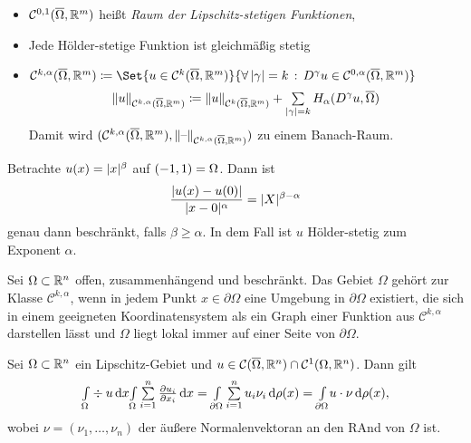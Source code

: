 \documentclass{cheat-sheet}
\newcommand{\Cont}{\mathcal{C}} %
\newcommand{\clos}[1]{\overline{#1}} %
\newcommand{\cOmega}{\clos{\Omega}} %
\newcommand{\bOmega}{\partial \Omega} %
\begin{document}
\begin{bem}
  \begin{itemize}
    \item $\Cont^{0,1}(\cOmega, \R^m)$ heißt \emph{Raum der Lipschitz-stetigen Funktionen},
    \item Jede Hölder-stetige Funktion ist gleichmäßig stetig
    \item $\Cont^{k,\alpha}(\cOmega, \R^m) \coloneqq \Set{u \in \Cont^k(\cOmega, \R^m)}{\fa{\abs{\gamma} = k} D^\gamma u \in \Cont^{0, \alpha}(\cOmega, \R^m)}$
    \[ \norm{u}_{\Cont^{k,\alpha}(\cOmega, \R^m)} \coloneqq \norm{u}_{\Cont^k(\cOmega, \R^m)} + \sum_{\abs{\gamma} = k} H_\alpha(D^\gamma u, \cOmega) \]
    Damit wird $(\Cont^{k,\alpha}(\cOmega, \R^m), \norm{\blank}_{\Cont^{k,\alpha}(\cOmega, \R^m)})$ zu einem Banach-Raum.
  \end{itemize}
\end{bem}

\begin{bsp}
  Betrachte $u(x) = \lvert x\rvert^\beta$ auf $\left( -1, 1 \right) = \Omega$. Dann ist
  \[ \frac{\lvert u(x) - u(0)\rvert}{\lvert x - 0\rvert^\alpha} = \lvert X\rvert^{\beta - \alpha} \]
  genau dann beschränkt, falls $\beta \geq \alpha$. In dem Fall ist $u$ Hölder-stetig zum Exponent $\alpha$.
\end{bsp}

\begin{defn}
  Sei $\Omega \subset \mathbb{R}^n$ offen, zusammenhängend und beschränkt.
  Das Gebiet $\Omega$ gehört zur Klasse $\Cont^{k,\alpha}$, wenn in jedem Punkt $x \in \bOmega$ eine Umgebung in $\bOmega$ existiert, die sich in einem geeigneten Koordinatensystem als ein Graph einer Funktion aus $\Cont^{k,\alpha}$ darstellen lässt und $\Omega$ liegt lokal immer auf einer Seite von $\bOmega$.
\end{defn}


\begin{satz}
  Sei $\Omega \subset \mathbb{R}^n$ ein Lipschitz-Gebiet und $u \in \Cont(\cOmega, \R^n) \cap \Cont^1(\Omega, \R^n)$.
  Dann gilt
  \[ \Int{\Omega}{}{\div u}{x} \Int{\Omega}{}{\sum_{i=1}^n \tfrac{\partial u_i}{\partial x_i}}{x} = \Int{\bOmega}{}{\sum_{i=1}^n u_i \nu_i}{\rho(x)} = \Int{\bOmega}{}{u \cdot \nu}{\rho(x)}, \]
  wobei $\nu = (\nu_1, \ldots, \nu_n)$ der äußere Normalenvektoran an den RAnd von $\Omega$ ist.
\end{satz}
\end{document}
